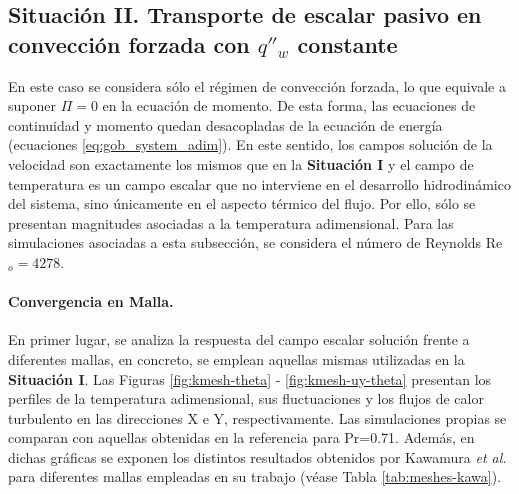 \begin{table}[H]
\centering
{}
\caption{Resoluciones espaciales empleadas por Kawamura \textit{et al.} \cite{kawamura2000dns}.}
\label{tab:meshes-kawa}
\end{table}

\newpage


\subsection{Situación II. Transporte de escalar pasivo en convección forzada con $q''_w$ constante}

En este caso se considera sólo el régimen de convección forzada, lo que equivale a suponer $\Pi=0$ en la ecuación de momento. De esta forma, las ecuaciones de continuidad y momento quedan desacopladas de la ecuación de energía (ecuaciones \ref{eq:gob_system_adim}). En este sentido, los campos solución de la velocidad son exactamente los mismos que en la \textbf{Situación I} y el campo de temperatura es un campo escalar que no interviene en el desarrollo hidrodinámico del sistema, sino únicamente en el aspecto térmico del flujo. Por ello, sólo se presentan magnitudes asociadas a la temperatura adimensional. Para las simulaciones asociadas a esta subsección, se considera el número de Reynolds Re$_o=4278$. 

\paragraph{Convergencia en Malla.}
En primer lugar, se analiza la respuesta del campo escalar solución frente a diferentes mallas, en concreto, se emplean aquellas mismas utilizadas en la \textbf{Situación I}.  Las Figuras \ref{fig:kmesh-theta} - \ref{fig:kmesh-uy-theta} presentan los perfiles de la temperatura adimensional, sus fluctuaciones y los flujos de calor turbulento en las direcciones X e Y, respectivamente. Las \linebreak simulaciones propias se comparan con aquellas obtenidas en la referencia \cite{kawamura2000dns} para Pr=0.71. Además, en dichas gráficas se exponen los distintos resultados obtenidos por Kawamura \textit{et al.} para diferentes mallas empleadas en su trabajo (véase Tabla \ref{tab:meshes-kawa}). 




